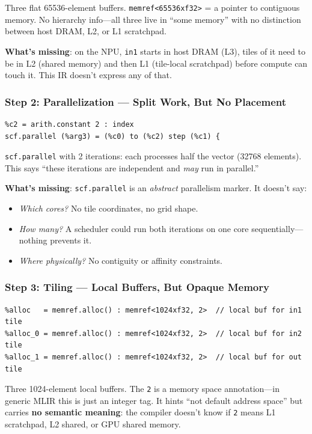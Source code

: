 \documentclass[11pt,a4paper]{article}
\begin{document}
Three flat 65536-element buffers. \texttt{memref<65536xf32>} = a pointer to
contiguous memory. No hierarchy info---all three live in ``some memory'' with no
distinction between host DRAM, L2, or L1 scratchpad.

\textbf{What's missing}: on the NPU, \texttt{in1} starts in host DRAM (L3), tiles of
it need to be in L2 (shared memory) and then L1 (tile-local scratchpad) before
compute can touch it. This IR doesn't express any of that.

\subsubsection{Step 2: Parallelization --- Split Work, But No Placement}
\begin{lstlisting}
%c2 = arith.constant 2 : index
scf.parallel (%arg3) = (%c0) to (%c2) step (%c1) {
\end{lstlisting}

\texttt{scf.parallel} with 2 iterations: each processes half the vector (32768
elements). This says ``these iterations are independent and \emph{may} run in
parallel.''

\textbf{What's missing}: \texttt{scf.parallel} is an \emph{abstract} parallelism
marker. It doesn't say:
\begin{itemize}[leftmargin=2em]
  \item \emph{Which cores?} No tile coordinates, no grid shape.
  \item \emph{How many?} A scheduler could run both iterations on one core
    sequentially---nothing prevents it.
  \item \emph{Where physically?} No contiguity or affinity constraints.
\end{itemize}

\subsubsection{Step 3: Tiling --- Local Buffers, But Opaque Memory}
\begin{lstlisting}
%alloc   = memref.alloc() : memref<1024xf32, 2>  // local buf for in1 tile
%alloc_0 = memref.alloc() : memref<1024xf32, 2>  // local buf for in2 tile
%alloc_1 = memref.alloc() : memref<1024xf32, 2>  // local buf for out tile
\end{lstlisting}

Three 1024-element local buffers. The \texttt{2} is a memory space annotation---in
generic MLIR this is just an integer tag. It hints ``not default address space'' but
carries \textbf{no semantic meaning}: the compiler doesn't know if \texttt{2} means
L1 scratchpad, L2 shared, or GPU shared memory.
\end{document}
